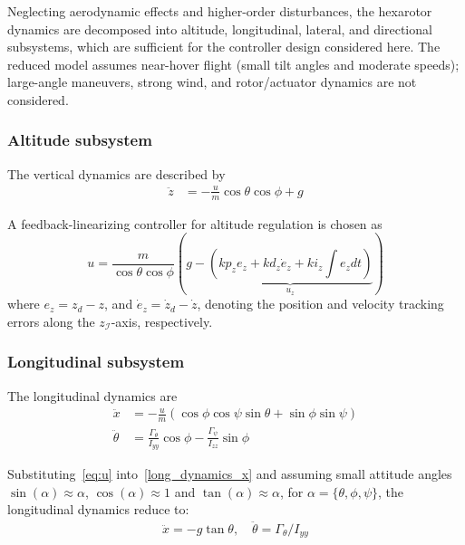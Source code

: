 \documentclass[conference]{IEEEtran}
\begin{document}
Neglecting aerodynamic effects and higher-order disturbances, the hexarotor dynamics are decomposed into altitude, longitudinal, lateral, and directional subsystems, which are sufficient for the controller design considered here. The reduced model assumes near-hover flight (small tilt angles and moderate speeds); large-angle maneuvers, strong wind, and rotor/actuator dynamics are not considered.

\medskip

\subsubsection{Altitude subsystem}
The vertical dynamics are described by
\begin{equation}\label{alt_dynamics}
\begin{aligned}
\ddot z &= -\frac{u }{m}\cos \theta \cos \phi + g 
\end{aligned}
\end{equation}

A feedback-linearizing controller for altitude regulation is chosen as 
%
\begin{equation}\label{eq:u}
    u= \frac{m}{\cos\theta \cos \phi}\left( g - \underbrace{\left(kp_z e_z+kd_z \dot e_z +ki_z\int e_zdt\right)}_{u_z}\right)
\end{equation}
%
where $e_z=z_d-z$, and $\dot e_z=\dot z_d-\dot z$, denoting the position and velocity tracking errors along the $z_\mathcal{I}$-axis, respectively.

\subsubsection{Longitudinal subsystem}
The longitudinal dynamics are
%
\begin{align}
\ddot x &= -\frac{u}{m} \left( \cos \phi \cos \psi \sin \theta + \sin \phi \sin \psi \right) \label{long_dynamics_x} \\
\ddot \theta &= \frac{\Gamma_\theta} {I_{yy}} \cos \phi -\frac{\Gamma_\psi}{I_{zz}} \sin \phi \label{long_dynamics_theta}
\end{align}

Substituting~\eqref{eq:u} into~\eqref{long_dynamics_x} and assuming small attitude angles $\sin(\alpha)\approx \alpha$, $\cos(\alpha)\approx 1$ and $\tan(\alpha) \approx \alpha$, for $\alpha=\{\theta,\phi,\psi\}$, the longitudinal dynamics reduce to:
%
\begin{align} \label{red_long_dynamics_x}
\ddot x = -g \tan \theta ,\quad  
\ddot \theta =  {\Gamma_\theta}/{I_{yy}} %
\end{align}
\end{document}
